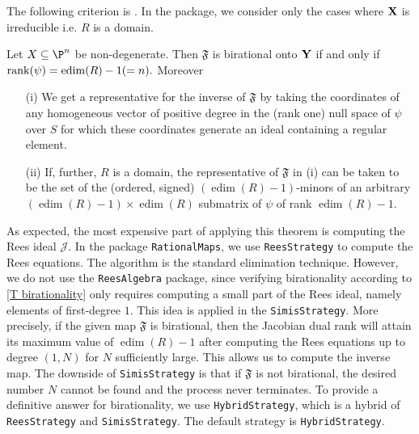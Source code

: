 \documentclass[11pt]{amsart}%
\numberwithin{equation}{theorem}
\def\XX{{\bf X}}
\def\YY{{\bf Y}}
\renewcommand{\:}{\colon}
\DeclareMathOperator{\edim}{edim}
\theoremstyle{theorem}
\begin{document}
\vspace{0.2in}
The  following  criterion is   \cite[Theorem 2.18 ]{DoriaHassanzadehSimisBirationality}. In the package, we consider only the cases where $\XX$ is irreducible i.e. $R$ is a domain.
\begin{theorem} \label{T birationality}Let $X\subseteq \P^n$ be non-degenerate. Then $\mathfrak{F}$ is birational onto $\YY$  if and only if ${\rm rank}(\psi)=\edim(R)-1(=n).$
Moreover
\begin{enumerate}
  \item[{\rm (i)}] We get a representative for the inverse of $\mathfrak{F}$ by taking the coordinates of any homogeneous vector of positive degree
in the {\rm (}rank one{\rm )} null space of $\psi$ over $S$ for which these coordinates generate an ideal containing
a regular element.

\item[{\rm (ii)}] If, further, $R$ is a domain, the representative of $\mathfrak{F}$ in {\rm (i)}
can be taken to be the set of the {\rm (}ordered, signed{\rm )} $(\edim(R)-1)$-minors
of an arbitrary $(\edim(R)-1)\times \edim(R)$ submatrix of $\psi$ of rank $\edim(R)-1$.
\end{enumerate}

\end{theorem}

As expected, the most expensive part of applying this theorem is computing the Rees ideal ${\mathcal J}$. In the package {\tt RationalMaps}, we use {\tt ReesStrategy} to compute the Rees equations. The algorithm is the standard elimination technique. However, we do not use the {\tt ReesAlgebra} package, since verifying birationality according to \autoref{T birationality} only requires  computing a small part of the Rees ideal, namely elements of first-degree $1$. This idea is applied in the {\tt SimisStrategy}. More precisely, if the given map $\mathfrak{F}$ is birational, then the Jacobian dual rank will attain its maximum value of $\edim(R)-1$ after computing the Rees equations up to  degree $(1,N)$ for $N$ sufficiently large. This allows us to compute the inverse map.  The downside of {\tt SimisStrategy} is that if $\mathfrak{F}$ is not birational,  the desired number $N$ cannot be found and the process never terminates. To provide a definitive answer for birationality,  we use {\tt HybridStrategy}, which is a hybrid of {\tt ReesStrategy} and {\tt SimisStrategy}.  The default strategy is {\tt HybridStrategy}.
\end{document}
